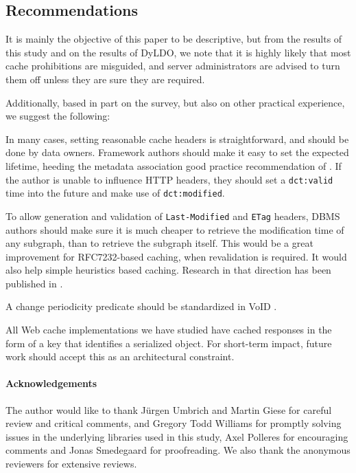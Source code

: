 \documentclass{llncs}
\newcommand{\rdfterm}[1]{\texttt{#1}}
\newcommand{\httph}[1]{\texttt{#1}}
\begin{document}
\subsection{Recommendations}

It is mainly the objective of this paper to be descriptive, but from
the results of this study and on the results of DyLDO, we note that it
is highly likely that most cache prohibitions are misguided, and
server administrators are advised to turn them off unless they are
sure they are required.

Additionally, based in part on the survey, but also on other practical
experience, we suggest the following:

In many cases, setting reasonable cache headers is straightforward,
and should be done by data owners. Framework authors should make it
easy to set the expected lifetime, heeding the metadata association
good practice recommendation of \cite{Jacobs:04:AWW}. If the author is
unable to influence HTTP headers, they should set a
\rdfterm{dct:valid} time into the future and make use of
\rdfterm{dct:modified}.

To allow generation and validation of \httph{Last-Modified} and
\httph{ETag} headers, DBMS authors should make sure it is much cheaper
to retrieve the modification time of any subgraph, than to retrieve
the subgraph itself. This would be a great improvement for
RFC7232-based caching, when revalidation is required. It would also
help simple heuristics based caching. Research in that direction has
been published in \cite{kaseicache}.

A change periodicity predicate should be standardized in VoID \cite{voidnote}.

All Web cache implementations we have studied have cached responses in
the form of a key that identifies a serialized object. For short-term
impact, future work should accept this as an architectural constraint.

\paragraph*{Acknowledgements} The author would like to thank Jürgen
Umbrich and Martin Giese for careful review and critical comments, and
Gregory Todd Williams for promptly solving issues in the underlying
libraries used in this study, Axel Polleres for encouraging comments
and Jonas Smedegaard for proofreading. We also thank the anonymous
reviewers for extensive reviews.

%

%
%

%
\end{document}
